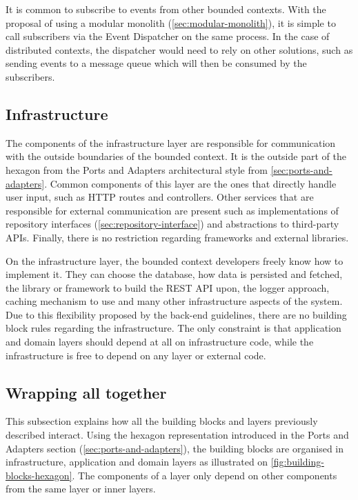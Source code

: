 It is common to subscribe to events from other bounded contexts. With the proposal of using a modular monolith (\autoref{sec:modular-monolith}), it is simple to call subscribers via the Event Dispatcher on the same process. In the case of distributed contexts, the dispatcher would need to rely on other solutions, such as sending events to a message queue which will then be consumed by the subscribers.

\subsection{Infrastructure}

The components of the infrastructure layer are responsible for communication with the outside boundaries of the bounded context. It is the outside part of the hexagon from the Ports and Adapters architectural style from \autoref{sec:ports-and-adapters}. Common components of this layer are the ones that directly handle user input, such as HTTP routes and controllers. Other services that are responsible for external communication are present such as implementations of repository interfaces (\autoref{sec:repository-interface}) and abstractions to third-party APIs. Finally, there is no restriction regarding frameworks and external libraries.

On the infrastructure layer, the bounded context developers freely know how to implement it. They can choose the database, how data is persisted and fetched, the library or framework to build the REST API upon, the logger approach, caching mechanism to use and many other infrastructure aspects of the system. Due to this flexibility proposed by the back-end guidelines, there are no building block rules regarding the infrastructure. The only constraint is that application and domain layers should depend at all on infrastructure code, while the infrastructure is free to depend on any layer or external code.

\subsection{Wrapping all together}

This subsection explains how all the building blocks and layers previously described interact. Using the hexagon representation introduced in the Ports and Adapters section (\autoref{sec:ports-and-adapters}), the building blocks are organised in infrastructure, application and domain layers as illustrated on \autoref{fig:building-blocks-hexagon}. The components of a layer only depend on other components from the same layer or inner layers.

